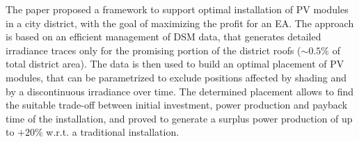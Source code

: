 The paper proposed a framework to support optimal installation of PV modules in a city district, with the goal of maximizing the profit for an EA. The approach is based on an efficient management of DSM data, that generates detailed irradiance traces only for the promising portion of the district roofs ($\sim0.5\%$ of total district area). The data is then used to build an optimal placement of PV modules, that can be parametrized to exclude positions affected by shading and by a discontinuous irradiance over time. The determined placement allows to find the suitable trade-off between initial investment, power production and payback time of the installation, and proved to generate a surplus power production of up to $+20\%$ w.r.t. a traditional installation. 